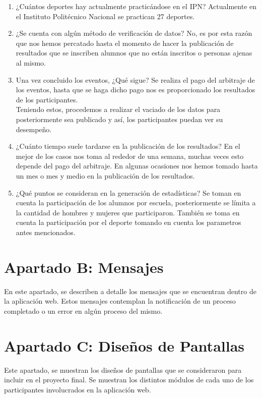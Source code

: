 \begin{enumerate}
		\item ¿Cuántos deportes hay actualmente practicándose en el IPN?
		Actualmente en el Instituto Politécnico Nacional se practican 27 deportes.
		
		\item ¿Se cuenta con algún método de verificación de datos?
		No, es por esta razón que nos hemos percatado hasta el momento de hacer la publicación de resultados que se inscriben alumnos que no están inscritos o personas ajenas al mismo.
		
		\item Una vez concluido los eventos, ¿Qué sigue?
		Se realiza el pago del arbitraje de los eventos, hasta que se haga dicho pago nos es proporcionado los resultados de los participantes.\\
		Teniendo estos, procedemos a realizar el vaciado de los datos para posteriormente sea publicado y así, los participantes puedan ver su desempeño.
		
		\item ¿Cuánto tiempo suele tardarse en la publicación de los resultados?
		En el mejor de los casos nos toma al rededor de una semana, muchas veces esto depende del pago del arbitraje. En algunas ocasiones nos hemos tomado hasta un mes o mes y medio en la publicación de los resultados. 
		
		\item ¿Qué puntos se consideran en la generación de estadísticas?
		Se toman en cuenta la participación de los alumnos por escuela, posteriormente se límita a la cantidad de hombres y mujeres que participaron. También se toma en cuenta la participación por el deporte tomando en cuenta los parametros antes mencionados.
		
	\end{enumerate} 
	
	\chapter{Apartado B: Mensajes}
	\noindent En este apartado, se describen a detalle los mensajes que se encuentran dentro de la aplicación web. Estos mensajes contemplan la notificación de un proceso completado o un error en algún proceso del mismo.
		
	
		\pagebreak
		
	\chapter{Apartado C: Diseños de Pantallas}
	\label{diseños}
	\noindent Este apartado, se muestran los diseños de pantallas que se consideraron para incluir en el proyecto final. Se muestran los distintos módulos de cada uno de los participantes involucrados en la aplicación web.
	
